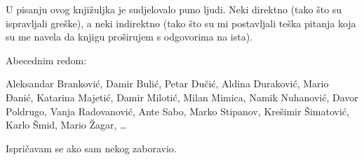 
U pisanju ovog knjižuljka je sudjelovalo puno ljudi.
Neki direktno (tako što su ispravljali greške), a neki indirektno (tako što su mi postavljali teška pitanja koja su me navela da knjigu proširujem s odgovorima na ista).

Abecednim redom:

Aleksandar Branković,
Damir Bulić,
Petar Dučić,
Aldina Duraković,
Mario Đanić,
Katarina Majetić,
Damir Milotić, 
Milan Mimica,
Namik Nuhanović,
Davor Poldrugo,
Vanja Radovanović,
Ante Sabo,
Marko Stipanov,
Krešimir Šimatović,
Karlo Šmid,
Mario Žagar,
\dots

Ispričavam se ako sam nekog zaboravio.
